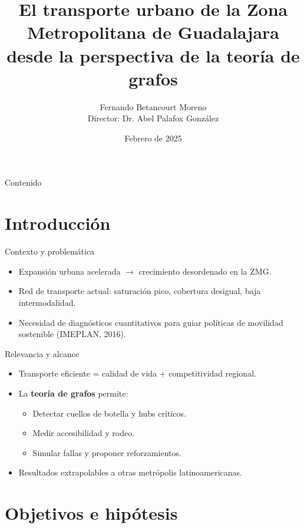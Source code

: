 \documentclass[aspectratio=169,spanish]{beamer}
\title[Transporte ZMG y Teoría de Grafos]{El transporte urbano de la Zona Metropolitana de Guadalajara\\desde la perspectiva de la teoría de grafos}
\author[F. Betancourt]{Fernando Betancourt Moreno\\\small Director: Dr. Abel Palafox González}
\institute[CUCEI -- UdeG]{Universidad de Guadalajara\\Centro Universitario de Ciencias Exactas e Ingenierías}
\date[Feb.~2025]{Febrero de 2025}
\begin{document}
\begin{frame}[plain]
  \titlepage
\end{frame}

\begin{frame}{Contenido}
  \tableofcontents
\end{frame}

\section{Introducción}

\begin{frame}{Contexto y problemática}
  \begin{itemize}
    \item Expansión urbana acelerada $\rightarrow$ crecimiento desordenado en la ZMG.
    \item Red de transporte actual: saturación pico, cobertura desigual, baja intermodalidad.
    \item Necesidad de diagnósticos cuantitativos para guiar políticas de movilidad sostenible (IMEPLAN, 2016).
  \end{itemize}
\end{frame}

\begin{frame}{Relevancia y alcance}
  \begin{itemize}
    \item Transporte eficiente = calidad de vida + competitividad regional.
    \item La \textbf{teoría de grafos} permite:
      \begin{itemize}
        \item Detectar cuellos de botella y hubs críticos.
        \item Medir accesibilidad y rodeo.
        \item Simular fallas y proponer reforzamientos.
      \end{itemize}
    \item Resultados extrapolables a otras metrópolis latinoamericanas.
  \end{itemize}
\end{frame}

\section{Objetivos e hipótesis}
\end{document}
